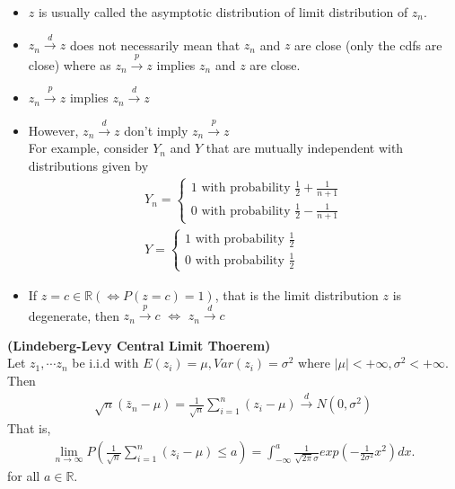 \documentclass[11pt]{article} %
\theoremstyle{definition}
\numberwithin{defn}{subsection}
\numberwithin{thm}{subsection}
\numberwithin{ex}{subsection}
\newcommand{\bb}[1]{\mathbb{#1}}
\newcommand{\R}{\bb{R}}
\newcommand{\plim}{\overset{p}{\rightarrow}}
\newcommand{\dlim}{\overset{d}{\rightarrow}}
\begin{document}
\begin{itemize}
	\item $z$ is usually called the asymptotic distribution of limit distribution of $z_n$.
	\item $z_n\overset{d}{\rightarrow}z$ does not necessarily mean that $z_n$ and $z$ are close (only the cdfs are close) where as $z_n\overset{p}{\rightarrow}z$ implies $z_n$ and $z$ are close.
	\item $z_n\overset{p}{\rightarrow}z$ implies $z_n\overset{d}{\rightarrow}z$
	\item However, $z_n\dlim z$ don't imply $z_n\plim z$\\
	For example, consider $Y_n$ and $Y$ that are mutually independent with distributions given by
	\begin{align*}
	Y_n=\begin{cases}
	1\text{ with probability }\frac{1}{2}+\frac{1}{n+1}\\
	0\text{ with probability }\frac{1}{2}-\frac{1}{n+1}
	\end{cases}\\
	Y=\begin{cases}
	1\text{ with probability }\frac{1}{2}\\
	0\text{ with probability }\frac{1}{2}
	\end{cases}
	\end{align*}
	\item If $z=c\in\R(\Leftrightarrow P(z=c)=1)$, that is the limit distribution $z$ is degenerate, then $z_n\overset{p}{\rightarrow}c$ $\Leftrightarrow$ $z_n\overset{d}{\rightarrow}c$
\end{itemize}

\begin{thm}\label{thm:lindeberglevyclt}
	\textbf{(Lindeberg-Levy Central Limit Thoerem)}\\
	Let $z_1,\cdots z_n$ be i.i.d with $E(z_i)=\mu,Var(z_i)=\sigma^2$ where $|\mu|<+\infty,\sigma^2<+\infty$. Then
	\begin{align*}
	\sqrt{n}(\bar{z}_n-\mu)=\frac{1}{\sqrt{n}}\sum_{i=1}^n (z_i-\mu)\overset{d}{\rightarrow} N(0,\sigma^2)
	\end{align*}
	That is,
	\begin{align*}
	\lim_{n\rightarrow\infty}P(\frac{1}{\sqrt{n}}\sum_{i=1}^n (z_i-\mu)\le a)=\int_{-\infty}^a\frac{1}{\sqrt{2\pi}\sigma}exp(-\frac{1}{2\sigma^2}x^2)dx.
	\end{align*}
	for all $a\in\R$.
\end{thm}
\end{document}
